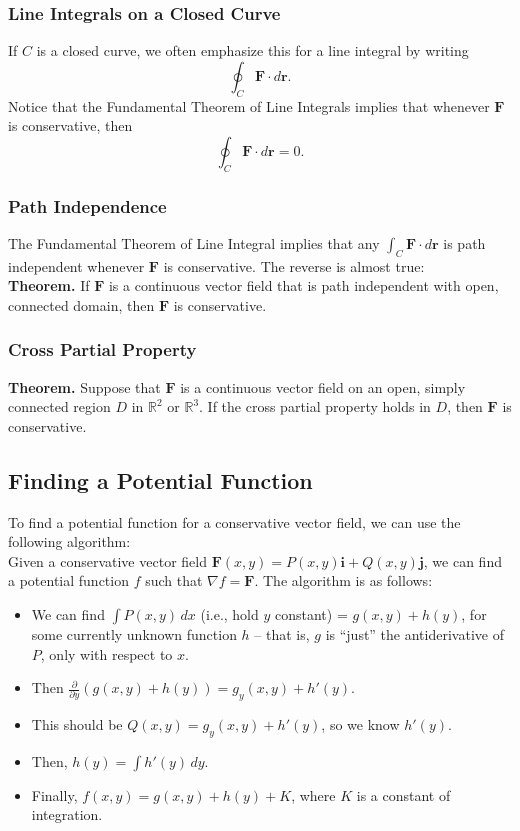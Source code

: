 \subsubsection{Line Integrals on a Closed Curve}

If \(C\) is a closed curve, we often emphasize this for a line integral by writing 
\[
    \oint_C \mathbf{F} \cdot d\mathbf{r}.
\]
Notice that the Fundamental Theorem of Line Integrals implies that whenever \(\mathbf{F}\) is conservative, then
\[
    \oint_C \mathbf{F} \cdot d\mathbf{r} = 0.
\]

\subsubsection{Path Independence}

The Fundamental Theorem of Line Integral implies that any \(\int_C \mathbf{F} \cdot d\mathbf{r}\) is path independent whenever \(\mathbf{F}\) is conservative. The reverse is almost true: \\

\textbf{Theorem.} If \(\mathbf{F}\) is a continuous vector field that is path independent with open, connected domain, then \(\mathbf{F}\) is conservative.

\subsubsection{Cross Partial Property}

\textbf{Theorem.} Suppose that \(\mathbf{F}\) is a continuous vector field on an open, simply connected region \(D\) in \(\mathbb{R}^2\) or \(\mathbb{R}^3\). If the cross partial property holds in \(D\), then \(\mathbf{F}\) is conservative.

\subsection{Finding a Potential Function}

To find a potential function for a conservative vector field, we can use the following algorithm: \\

Given a conservative vector field \(\mathbf{F}(x,y) = P(x,y)\mathbf{i} + Q(x,y)\mathbf{j}\), we can find a potential function \(f\) such that \(\nabla f = \mathbf{F}\). The algorithm is as follows:

\begin{itemize}
    \item We can find \(\int P(x,y) \, dx\) (i.e., hold \(y\) constant) = \(g(x,y) + h(y)\), for some currently unknown function \(h\) – that is, \(g\) is “just” the antiderivative of \(P\), only with respect to \(x\).
    \item Then \(\frac{\partial}{\partial y} (g(x,y) + h(y)) = g_y(x,y) + h'(y)\).
    \item This should be \(Q(x,y) = g_y(x,y) + h'(y)\), so we know \(h'(y)\).
    \item Then, \(h(y) = \int h'(y) \, dy\).
    \item Finally, \(f(x,y) = g(x,y) + h(y) + K\), where \(K\) is a constant of integration.
\end{itemize}

